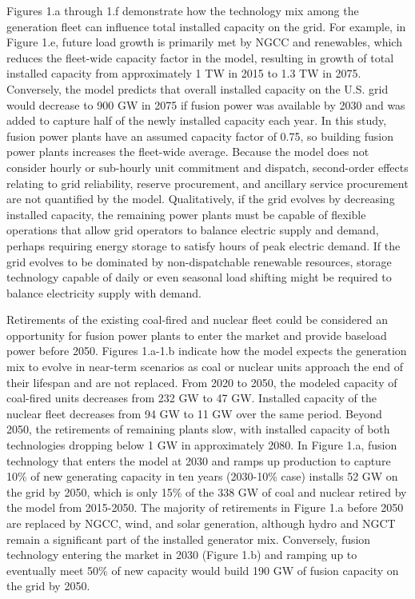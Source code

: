 \documentclass[review]{elsarticle}
\begin{document}
Figures 1.a through 1.f demonstrate how the technology mix among the generation fleet can influence total installed capacity on the grid. For example, in Figure 1.e, future load growth is primarily met by NGCC and renewables, which reduces the fleet-wide capacity factor in the model, resulting in growth of total installed capacity from approximately 1 TW in 2015 to 1.3 TW in 2075. Conversely, the model predicts that overall installed capacity on the U.S. grid would decrease to 900 GW in 2075 if fusion power was available by 2030 and was added to capture half of the newly installed capacity each year. In this study, fusion power plants have an assumed capacity factor of 0.75, so building fusion power plants increases the fleet-wide average. Because the model does not consider hourly or sub-hourly unit commitment and dispatch, second-order effects relating to grid reliability, reserve procurement, and ancillary service procurement are not quantified by the model. Qualitatively, if the grid evolves by decreasing installed capacity, the remaining power plants must be capable of flexible operations that allow grid operators to balance electric supply and demand, perhaps requiring energy storage to satisfy hours of peak electric demand. If the grid evolves to be dominated by non-dispatchable renewable resources, storage technology capable of daily or even seasonal load shifting might be required to balance electricity supply with demand.

Retirements of the existing coal-fired and nuclear fleet could be considered an opportunity for fusion power plants to enter the market and provide baseload power before 2050. Figures 1.a-1.b indicate how the model expects the generation mix to evolve in near-term scenarios as coal or nuclear units approach the end of their lifespan and are not replaced. From 2020 to 2050, the modeled capacity of coal-fired units decreases from 232 GW to 47 GW. Installed capacity of the nuclear fleet decreases from 94 GW to 11 GW over the same period. Beyond 2050, the retirements of remaining plants slow, with installed capacity of both technologies dropping below 1 GW in approximately 2080. In Figure 1.a, fusion technology that enters the model at 2030 and ramps up production to capture 10\% of new generating capacity in ten years (2030-10\% case) installs 52 GW on the grid by 2050, which is only 15\% of the 338 GW of coal and nuclear retired by the model from 2015-2050. The majority of retirements in Figure 1.a before 2050 are replaced by NGCC, wind, and solar generation, although hydro and NGCT remain a significant part of the installed generator mix. Conversely, fusion technology entering the market in 2030 (Figure 1.b) and ramping up to eventually meet 50\% of new capacity would build 190 GW of fusion capacity on the grid by 2050. 
\end{document}

